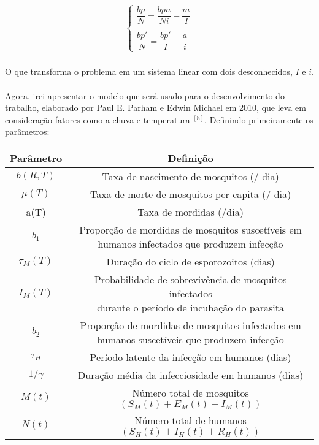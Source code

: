 \documentclass[12pt]{article}
\begin{document}
\begin{gather*}
\begin{cases}
\dfrac{bp}{N} = \dfrac{bpn}{Ni} -\dfrac{m}{I} \\
\\
\dfrac{bp'}{N} = \dfrac{bp'}{I} -\dfrac{a}{i} 
\end{cases}
\end{gather*}
\\
O que transforma o problema em um sistema linear com dois desconhecidos, $I$ e $i$.
\\\\
Agora, irei apresentar o modelo que será usado para o desenvolvimento do trabalho, elaborado por Paul E. Parham e Edwin Michael em 2010, que leva em consideração fatores como a chuva e temperatura $^{[8]}$. Definindo primeiramente os parâmetros:
\begin{center}
\begin{tabular}{|c | c|} 
 \hline
 \textbf{Parâmetro} & \textbf{Definição} \\ 
 \hline
 $b(R, T)$ & Taxa de nascimento de mosquitos (/ dia) \\ 
 \hline
 $\mu(T)$ & Taxa de morte de mosquitos per capita (/ dia) \\
 \hline
 a(T) & Taxa de mordidas (/dia)  \\
 \hline
 $b_1$ & \makecell{Proporção de mordidas de mosquitos suscetíveis em \\ humanos infectados que produzem infecção} \\
 \hline
 $\tau_M(T)$ & Duração do ciclo de esporozoitos (dias) \\
 \hline
 $I_M(T)$ & \makecell{Probabilidade de sobrevivência de mosquitos infectados \\ durante o período de incubação do parasita} \\
 \hline
 $b_2$ & \makecell{Proporção de mordidas de mosquitos infectados em \\ humanos suscetíveis que produzem infecção} \\
 \hline
 $\tau_H$ & Período latente da infecção em humanos (dias) \\
 \hline
 $1/\gamma$ & Duração média da infecciosidade em humanos (dias) \\
 \hline
 $M(t)$ & Número total de mosquitos $(S_M(t) + E_M(t) + I_M(t))$ \\
 \hline
 $N(t)$ & Número total de humanos $(S_H(t) + I_H(t) + R_H(t) )$ \\  
 \hline
\end{tabular}
\end{center}
\end{document}
